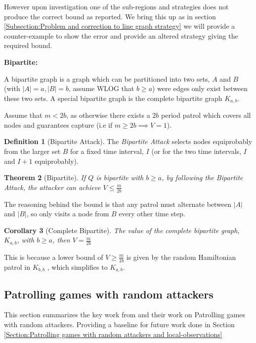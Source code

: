 \documentclass[a4paper,10pt]{article}
\newtheorem{theorem}{Theorem}[section]
\newtheorem{corollary}[theorem]{Corollary}
\theoremstyle{definition}
\newtheorem{definition}[theorem]{Definition}
\theoremstyle{definition}
\theoremstyle{remark}
\theoremstyle{definition}
\begin{document}
However upon investigation one of the sub-regions and strategies does not produce the correct bound as reported. We bring this up as in section \ref{Subsection:Problem and correction to line graph strategy} we will provide a counter-example to show the error and provide an altered strategy giving the required bound.

\textbf{Bipartite:}

A bipartite graph is a graph which can be partitioned into two sets, $A$ and $B$ (with $|A|=a,|B|=b$, assume WLOG that $b \geq a$) were edges only exist between these two sets. A special bipartite graph is the complete bipartite graph $K_{a,b}$.

Assume that $m < 2b$, as otherwise there exists a $2b$ period patrol which covers all nodes and guarantees capture (i.e if $m \geq 2b  \implies V=1$).

\begin{definition}[Bipartite Attack]
The \textit{Bipartite Attack} selects nodes equiprobably from the larger set $B$ for a fixed time interval, $I$ (or for the two time intervals, $I$ and $I+1$ equiprobably).
\end{definition}

\begin{theorem}[Bipartite]
If $Q$ is bipartite with $b \geq a$, by following the Bipartite Attack, the attacker can achieve $V \leq \frac{m}{2b}$
\end{theorem}

The reasoning behind the bound is that any patrol must alternate between $|A|$ and $|B|$, so only visits a node from $B$ every other time step. 

\begin{corollary}[Complete Bipartite]
\label{Corollary:Complete Bipartite}
The value of the complete bipartite graph, $K_{a,b}$, with $b \geq a$, then $V=\frac{m}{2b}$
\end{corollary}

This is because a lower bound of $V \geq \frac{m}{2b}$ is given by the random Hamiltonian patrol in $K_{b,b}$ , which simplifies to $K_{a,b}$.

\subsection{Patrolling games with random attackers}
\label{Section:Patrolling games with random attackers}
This section summarizes the key work from \cite{Lin2013} and their work on Patrolling games with random attackers. Providing a baseline for future work done in Section \ref{Section:Patrolling games with random attackers and local-observations}
\end{document}
